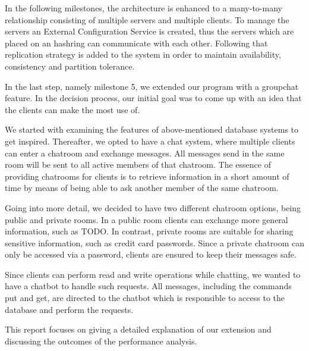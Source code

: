 In the following milestones, the architecture is enhanced to a many-to-many relationship consisting of multiple servers and multiple clients. To manage the servers an External Configuration Service is created, thus the servers which are placed on an hashring can communicate with each other. Following that replication strategy is added to the system in order to maintain availability, consistency and partition tolerance. 

In the last step, namely milestone 5, we extended our program with a groupchat feature. In the decision process, our initial goal was to come up with an idea that the clients can make the most use of.

We started with examining the features of above-mentioned database systems to get inspired. Thereafter, we opted to have a chat system, where multiple clients can enter a chatroom and exchange messages. All messages send in the same room will be sent to all active members of that chatroom. The essence of providing chatrooms for clients is to retrieve information in a short amount of time by means of being able to ask another member of the same chatroom. 

Going into more detail, we decided to have two different chatroom options, being public and private rooms. In a public room clients can exchange more general information, such as TODO. In contrast, private rooms are suitable for sharing sensitive information, such as credit card passwords. Since a private chatroom can only be accessed via a password, clients are ensured to keep their messages safe.

Since clients can perform read and write operations while chatting, we wanted to have a chatbot to handle such requests. All messages, including the commands put and get, are directed to the chatbot which is responsible to access to the database and perform the requests.
 
This report focuses on giving a detailed explanation of our extension and discussing the outcomes of the performance analysis.
